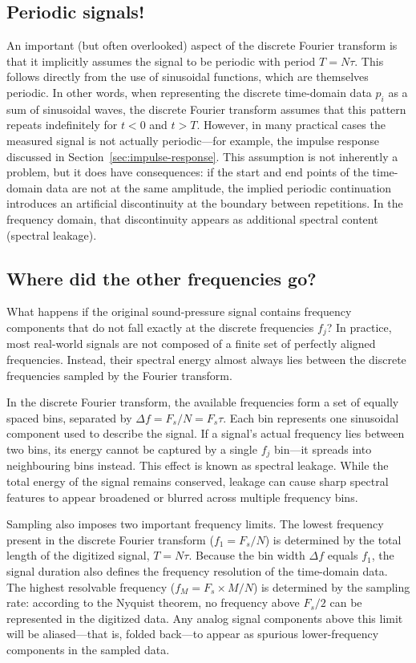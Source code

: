 \documentclass[12pt,a4paper]{article}
\begin{document}
\subsection{Periodic signals!}
An important (but often overlooked) aspect of the discrete Fourier transform is that it implicitly assumes the signal to be periodic with period $T = N\tau$.  
This follows directly from the use of sinusoidal functions, which are themselves periodic.  
In other words, when representing the discrete time-domain data $p_i$ as a sum of sinusoidal waves, the discrete Fourier transform assumes that this pattern repeats indefinitely for $t < 0$ and $t > T$.  
However, in many practical cases the measured signal is not actually periodic—for example, the impulse response discussed in Section~\ref{sec:impulse-response}.  
This assumption is not inherently a problem, but it does have consequences: if the start and end points of the time-domain data are not at the same amplitude, the implied periodic continuation introduces an artificial discontinuity at the boundary between repetitions.  
In the frequency domain, that discontinuity appears as additional spectral content (spectral leakage).

\subsection{Where did the other frequencies go?}
What happens if the original sound-pressure signal contains frequency components that do not fall exactly at the discrete frequencies $f_j$?  
In practice, most real-world signals are not composed of a finite set of perfectly aligned frequencies.  
Instead, their spectral energy almost always lies between the discrete frequencies sampled by the Fourier transform.

In the discrete Fourier transform, the available frequencies form a set of equally spaced bins, separated by $\Delta f = F_s/N = F_s \tau$.  
Each bin represents one sinusoidal component used to describe the signal.  
If a signal’s actual frequency lies between two bins, its energy cannot be captured by a single $f_j$ bin—it spreads into neighbouring bins instead.  
This effect is known as spectral leakage.  
While the total energy of the signal remains conserved, leakage can cause sharp spectral features to appear broadened or blurred across multiple frequency bins.

Sampling also imposes two important frequency limits.  
The lowest frequency present in the discrete Fourier transform ($f_1 = F_s/N$) is determined by the total length of the digitized signal, $T = N\tau$.  
Because the bin width $\Delta f$ equals $f_1$, the signal duration also defines the frequency resolution of the time-domain data.  
The highest resolvable frequency ($f_M = F_s \times M / N$) is determined by the sampling rate: according to the Nyquist theorem, no frequency above $F_s/2$ can be represented in the digitized data.  
Any analog signal components above this limit will be aliased—that is, folded back—to appear as spurious lower-frequency components in the sampled data.
\end{document}
